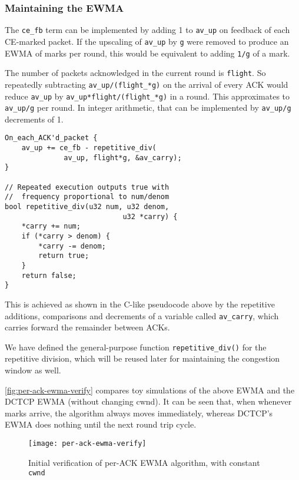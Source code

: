\subsubsection{Maintaining the EWMA}

The \texttt{ce\_fb} term can be implemented by adding 1 to \texttt{av\_up} on feedback of each CE-marked packet. If the upscaling of \texttt{av\_up} by \texttt{g} were removed to produce an EWMA of marks per round, this would be equivalent to adding \texttt{1/g} of a mark.

The number of packets acknowledged in the current round is \texttt{flight}. So repeatedly subtracting \texttt{av\_up/(flight\_*g)} on the arrival of every ACK would reduce \texttt{av\_up} by \texttt{av\_up*flight/(flight\_*g)} in a round. This approximates to \texttt{av\_up/g} per round. In integer arithmetic, that can be implemented by \texttt{av\_up/g} decrements of 1. 

\begin{verbatim}
On_each_ACK'd_packet {
    av_up += ce_fb - repetitive_div(
              av_up, flight*g, &av_carry);
}

// Repeated execution outputs true with 
//  frequency proportional to num/denom
bool repetitive_div(u32 num, u32 denom, 
                            u32 *carry) {
    *carry += num;
    if (*carry > denom) {
        *carry -= denom;
        return true;
    }
    return false;
}
\end{verbatim}

This is achieved as shown %
in the C-like pseudocode above by the repetitive additions, comparisons and decrements of a variable called \texttt{av\_carry}, which carries forward the remainder between ACKs. 

We have defined the general-purpose function \texttt{repetitive\_div()} for the repetitive division, which will be reused later for maintaining the congestion window as well.

\autoref{fig:per-ack-ewma-verify} compares toy simulations of the above EWMA and the DCTCP EWMA (without changing cwnd). It can be seen that, when whenever marks arrive, the algorithm always moves immediately, whereas DCTCP's EWMA does nothing until the next round trip cycle.
\begin{figure}[h]
	\texttt{[image: per-ack-ewma-verify]}
	\caption{Initial verification of per-ACK EWMA algorithm, with constant \texttt{cwnd}}\label{fig:per-ack-ewma-verify}
\end{figure}

